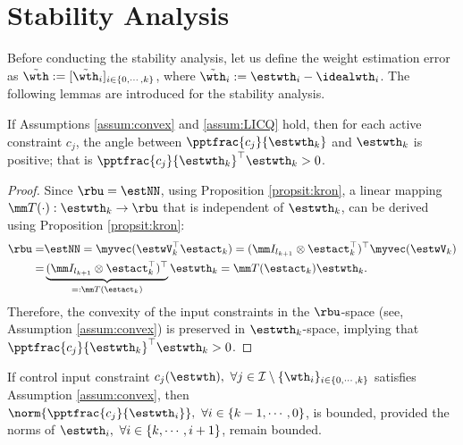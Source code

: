 \documentclass[journal]{IEEEtran}
\begin{document}
\section{Stability Analysis}\label{sec:stability}

Before conducting the stability analysis, let us define the weight estimation error as $\tilde\wth:= [\tilde\wth_i]_{i\in\{0,\cdots,k\}}$, where $\tilde\wth_i:=\estwth_i-\idealwth_i$.
The following lemmas are introduced for the stability analysis. 

\begin{lem}
    If Assumptions \ref{assum:convex} and \ref{assum:LICQ} hold, then for each active constraint $c_j$, the angle between $\pptfrac{c_j}{\estwth_k}$ and $\estwth_k$ is positive; that is $\pptfrac{c_j}{\estwth_k}^\top\estwth_k>0$.
    \label{lem:convex:angle}
\end{lem}

\begin{proof}

Since $\rbu = \estNN$, using Proposition \ref{propsit:kron}, a linear mapping $\mm T(\cdot):\estwth_k\to\rbu$ that is independent of $\estwth_k$, can be derived using Proposition \ref{propsit:kron}:
\begin{equation}\label{eq:linear:map}
    \begin{aligned}
    \rbu 
    = 
    &
    \estNN 
    =
    \myvec(
        \estwV_k^\top \estact_k
    ) 
    = 
    (
        \mm I_{l_{k+1}}
        \otimes 
        \estact_k^\top
    )^\top
    \myvec(\estwV_k)
    \\
    = &
    \underbrace{
        (
        \mm I_{l_{k+1}}
        \otimes 
        \estact_k^\top
    )^\top}_{=:\mm T(\estact_k)}
    \estwth_k 
    =
    \mm T(\estact_k) \estwth_k.
    \end{aligned}
\end{equation}
Therefore, the convexity of the input constraints in the $\rbu$-space (see, Assumption \ref{assum:convex}) is preserved in $\estwth_k$-space, implying
that $\pptfrac{c_j}{\estwth_k}^\top\estwth_k>0$.

\end{proof}

\begin{lem} 
    If control input constraint $c_j(\estwth),\ \forall j\in\mathcal I \setminus \{\wth_i\}_{i\in\{0,\cdots,k\}}$ satisfies Assumption \ref{assum:convex}, then $\norm{\pptfrac{c_j}{\estwth_i}},\ \forall i\in\{k-1,\cdots, 0\}$, is bounded, provided the norms of $\estwth_i,\ \forall i\in\{k,\cdots, i+1\}$, remain bounded.
    \label{lem:cstr:grad:bound}
\end{lem}
\end{document}
